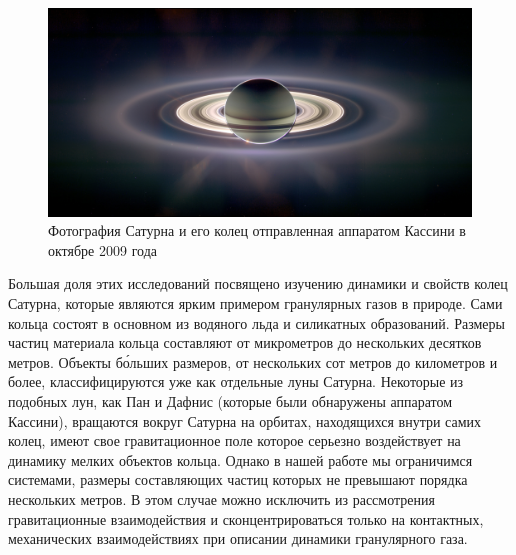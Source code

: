 \begin{figure}[ht]
    \centering
    \includegraphics[width=\textwidth]{figures/newrings_cassini_big.jpg}
    \caption{Фотография Сатурна и его колец отправленная аппаратом Кассини в октябре 2009 года}
    \label{fig:cassini_saturn_panorama}
\end{figure}

Большая доля этих исследований посвящено изучению динамики и свойств колец Сатурна, которые являются ярким примером гранулярных газов в природе. 
Сами кольца состоят в основном из водяного льда и силикатных образований. Размеры частиц материала кольца составляют от микрометров до нескольких 
десятков метров. Объекты б\'{о}льших размеров, от нескольких сот метров до километров и более, классифицируются уже как отдельные луны Сатурна. 
Некоторые из подобных лун, как Пан и Дафнис (которые были обнаружены аппаратом Кассини), вращаются вокруг Сатурна на орбитах, находящихся внутри самих колец, 
имеют свое гравитационное поле которое серьезно воздействует на динамику мелких объектов кольца. Однако в нашей работе мы ограничимся системами, 
размеры составляющих частиц которых не превышают порядка нескольких метров. 
В этом случае можно исключить из рассмотрения гравитационные взаимодействия и сконцентрироваться только на контактных, механических
взаимодействиях при описании динамики гранулярного газа.

